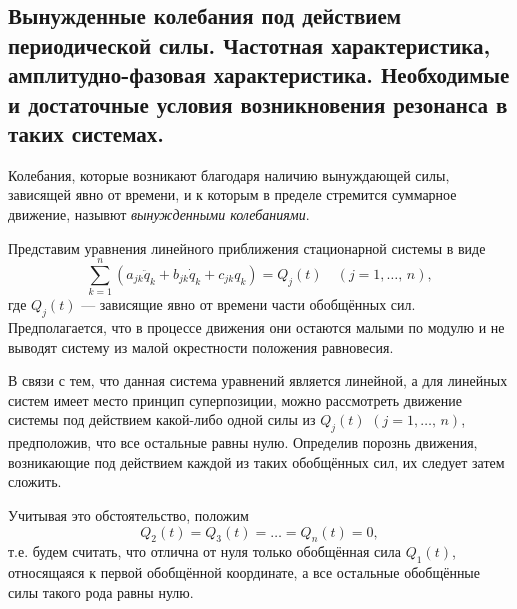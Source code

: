 \documentclass[a4paper]{article}
\begin{document}
\subsection{Вынужденные колебания под действием периодической силы. Частотная
характеристика, амплитудно-фазовая характеристика. Необходимые и достаточные
условия возникновения резонанса в таких системах.}
\begin{dfn}
	Колебания, которые возникают благодаря наличию вынуждающей силы,
	зависящей явно от времени, и к которым в пределе стремится суммарное
	движение, назывют \emph{вынужденными колебаниями}.
\end{dfn}
Представим уравнения линейного приближения стационарной системы в виде
\[
	\sum_{k=1}^{n} (a_{jk}\ddot{q}_k+b_{jk}\dot{q}_k+c_{jk}q_k)=Q_j (t)
	\quad (j=1,\ldots,\,n),
\] 
где $Q_j (t)$ --- зависящие явно от времени части обобщённых сил.
Предполагается, что в процессе движения они остаются малыми по модулю и не
выводят систему из малой окрестности положения равновесия.

В связи с тем, что данная система уравнений является линейной, а для линейных
систем имеет место принцип суперпозиции, можно рассмотреть движение системы
под действием какой-либо одной силы из $Q_j(t)$ $(j=1,\ldots,\,n)$, предположив,
что все остальные равны нулю. Определив порознь движения, возникающие под
действием каждой из таких обобщённых сил, их следует затем сложить.

Учитывая это обстоятельство, положим
\[
	Q_2(t)=Q_3(t)=\ldots=Q_n(t)=0,
\]
т.\:е. будем считать, что отлична от нуля только обобщённая сила $Q_1(t)$,
относящаяся к первой обобщённой координате, а все остальные обобщённые силы
такого рода равны нулю.
 
\end{document}
